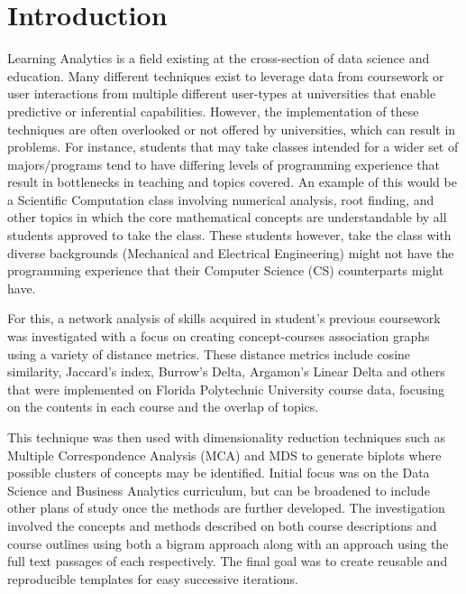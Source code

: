 %
%
%

\chapter{Introduction}
\label{introduction}



\hspace*{0.5cm} Learning Analytics is a field existing at the cross-section of data science and education. 
Many different techniques exist to leverage data from coursework or user interactions from multiple different user-types at universities that enable predictive 
or inferential capabilities. However, the implementation of these techniques are often overlooked or not offered by universities, which can result in problems. 
For instance, students that may take classes intended for a wider set of majors/programs tend to have differing levels of programming experience that result in 
bottlenecks in teaching and topics covered. An example of this would be a Scientific Computation class involving numerical analysis, root finding, and other topics in which the
 core mathematical concepts are understandable by all students approved to take the class. These students however, take the class  with diverse backgrounds (Mechanical and 
 Electrical Engineering) might not have the programming experience that their Computer Science (CS) counterparts might have.  

For this, a network analysis of skills acquired in student’s previous coursework was investigated with a focus on creating concept-courses association graphs using 
a variety of distance metrics.  These distance metrics include cosine similarity,  Jaccard's index, Burrow's Delta, Argamon's Linear Delta and others \cite{lan_tag-aware_2014} 
\cite{lan_sparse_nodate}  that were implemented on Florida Polytechnic University course data, focusing on the contents in each course and the overlap of topics. 

\indent This technique was then used with dimensionality reduction techniques such as Multiple Correspondence Analysis (MCA) and MDS to generate biplots where 
possible clusters of concepts may be identified.  Initial focus was on the Data Science and Business Analytics curriculum, but can be broadened to include other plans of 
study once the methods are further developed. The investigation involved the concepts and methods described on both course descriptions and course outlines using both a 
bigram approach along with an approach using the full text passages of each respectively.  The final goal was to create reusable and reproducible templates for easy successive 
iterations. 
